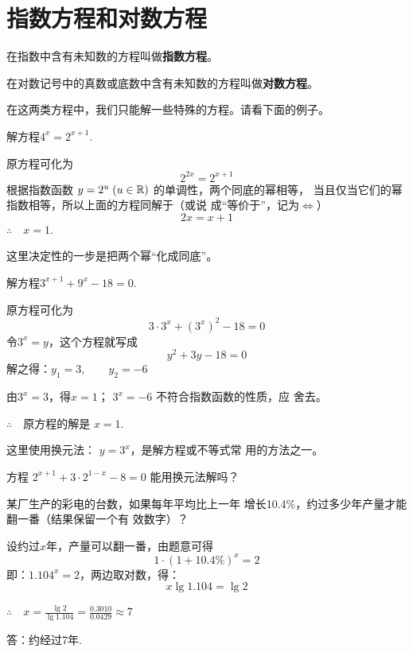 \section{指数方程和对数方程}
在指数中含有未知数的方程叫做\textbf{指数方程}。

在对数记号中的真数或底数中含有未知数的方程叫做\textbf{对数方程}。

在这两类方程中，我们只能解一些特殊的方程。请看下面的例子。

\begin{example}
    解方程$4^x=2^{x+1}$.
\end{example}

\begin{solution}
    原方程可化为$$2^{2x}=2^{x+1}$$
根据指数函数
$y=2^u\; (u\in\mathbb{R})$
的单调性，两个同底的幂相等，
当且仅当它们的幂指数相等，所以上面的方程同解于（或说
成“等价于”，记为$\Longleftrightarrow$）
\[2x=x+1\] 
$\therefore\quad x=1$.
\end{solution}

\begin{note}
    这里决定性的一步是把两个幂“化成同底”。
\end{note}

\begin{example}
     解方程$3^{x+1}+9^x-18=0$.
\end{example}

\begin{solution}
    原方程可化为
\[3\cdot 3^x +(3^x)^2-18=0\]
令$3^x=y$，这个方程就写成
\[y^2+3y-18=0\]
解之得：$y_1=3,\qquad y_2=-6$

由$3^x=3$，得$x=1$；
$3^x=-6$
不符合指数函数的性质，应
舍去。

$\therefore\quad $原方程的解是
$x=1$.
\end{solution}

\begin{note}
    这里使用换元法：
$y=3^x$，是解方程或不等式常
用的方法之一。
\end{note}

\begin{blk}
    方程
$2^{x+1}+3\cdot 2^{1-x}-8=0$
能用换元法解吗？
\end{blk}

\begin{example}
   某厂生产的彩电的台数，如果每年平均比上一年
增长10.4\%，约过多少年产量才能翻一番（结果保留一个有
效数字）？ 
\end{example}

\begin{solution}
    设约过$x$年，产量可以翻一番，由题意可得
\[1\cdot (1+10.4\%)^x=2\]
即：$1.104^x=2$，两边取对数，得：
\[x\lg 1.104=\lg 2\]

$\therefore\quad x=\frac{\lg 2}{\lg 1.104}=\frac{0.3010}{0.0429}\approx 7$

答：约经过7年.
\end{solution}

